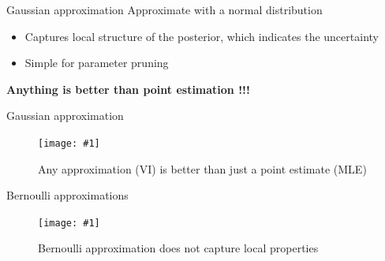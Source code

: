 \documentclass{beamer}
\newcommand{\fitfigure}[1]{\centering\texttt{[image: \#1]}}
\begin{document}
\begin{frame}{Gaussian approximation}
	Approximate with a normal distribution
	\begin{itemize}
		\item Captures local structure of the posterior, which indicates the uncertainty
		\item Simple for parameter pruning
	\end{itemize}
	\centerline{  }
	\textbf{\Huge{Anything is better than point estimation !!!}}
\end{frame}

\begin{frame}{Gaussian approximation}
	\begin{figure}
		\fitfigure{im/approximation.png}
		\caption{Any approximation (VI) is better than just a point estimate (MLE)}
	\end{figure}
\end{frame}

\begin{frame}{Bernoulli approximations}
	\begin{figure}
		\fitfigure{im/gaussian_or_bernoulli.png}
		\caption{Bernoulli approximation does not capture local properties}
	\end{figure}
\end{frame}
\end{document}
